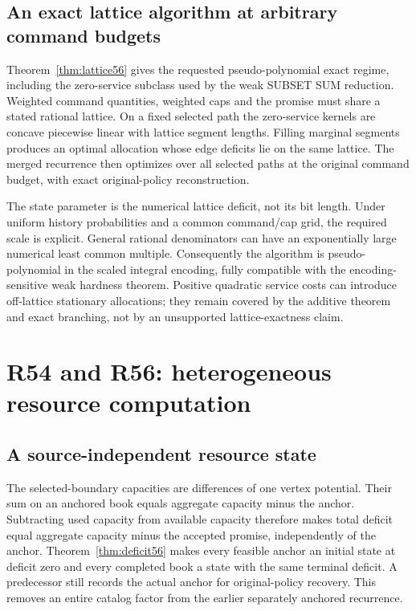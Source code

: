 \subsection{An exact lattice algorithm at arbitrary command budgets}
Theorem~\ref{thm:lattice56} gives the requested pseudo-polynomial exact regime, including the zero-service subclass used by the weak SUBSET SUM reduction. Weighted command quantities, weighted caps and the promise must share a stated rational lattice. On a fixed selected path the zero-service kernels are concave piecewise linear with lattice segment lengths. Filling marginal segments produces an optimal allocation whose edge deficits lie on the same lattice. The merged recurrence then optimizes over all selected paths at the original command budget, with exact original-policy reconstruction.

The state parameter is the numerical lattice deficit, not its bit length. Under uniform history probabilities and a common command/cap grid, the required scale is explicit. General rational denominators can have an exponentially large numerical least common multiple. Consequently the algorithm is pseudo-polynomial in the scaled integral encoding, fully compatible with the encoding-sensitive weak hardness theorem. Positive quadratic service costs can introduce off-lattice stationary allocations; they remain covered by the additive theorem and exact branching, not by an unsupported lattice-exactness claim.

\section{R54 and R56: heterogeneous resource computation}
\subsection{A source-independent resource state}
The selected-boundary capacities are differences of one vertex potential. Their sum on an anchored book equals aggregate capacity minus the anchor. Subtracting used capacity from available capacity therefore makes total deficit equal aggregate capacity minus the accepted promise, independently of the anchor. Theorem~\ref{thm:deficit56} makes every feasible anchor an initial state at deficit zero and every completed book a state with the same terminal deficit. A predecessor still records the actual anchor for original-policy recovery. This removes an entire catalog factor from the earlier separately anchored recurrence.

